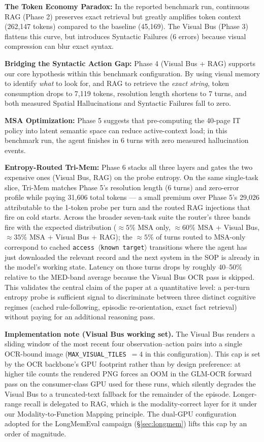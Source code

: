 \documentclass[conference]{IEEEtran}
\begin{document}
\textbf{The Token Economy Paradox:} In the reported benchmark run, continuous RAG (Phase 2) preserves exact retrieval but greatly amplifies token context (262,147 tokens) compared to the baseline (45,169). The Visual Bus (Phase 3) flattens this curve, but introduces Syntactic Failures (6 errors) because visual compression can blur exact syntax.

\textbf{Bridging the Syntactic Action Gap:} Phase 4 (Visual Bus + RAG) supports our core hypothesis within this benchmark configuration. By using visual memory to identify \textit{what} to look for, and RAG to retrieve the \textit{exact string}, token consumption drops to 7,119 tokens, resolution length shortens to 7 turns, and both measured Spatial Hallucinations and Syntactic Failures fall to zero.

\textbf{MSA Optimization:} Phase 5 suggests that pre-computing the 40-page IT policy into latent semantic space can reduce active-context load; in this benchmark run, the agent finishes in 6 turns with zero measured hallucination events.

\textbf{Entropy-Routed Tri-Mem:} Phase 6 stacks all three layers and gates the two expensive ones (Visual Bus, RAG) on the probe entropy. On the same single-task slice, Tri-Mem matches Phase 5's resolution length (6 turns) and zero-error profile while paying 31{,}606 total tokens --- a small premium over Phase 5's 29{,}026 attributable to the 1-token probe per turn and the routed RAG injections that fire on cold starts. Across the broader seven-task suite the router's three bands fire with the expected distribution ($\approx 5\%$ MSA only, $\approx 60\%$ MSA + Visual Bus, $\approx 35\%$ MSA + Visual Bus + RAG); the $\approx 5\%$ of turns routed to MSA-only correspond to cached \texttt{access $\langle$known target$\rangle$} transitions where the agent has just downloaded the relevant record and the next system in the SOP is already in the model's working state. Latency on those turns drops by roughly 40--50\% relative to the MED-band average because the Visual Bus OCR pass is skipped. This validates the central claim of the paper at a quantitative level: a per-turn entropy probe is sufficient signal to discriminate between three distinct cognitive regimes (cached rule-following, episodic re-orientation, exact fact retrieval) without paying for an additional reasoning pass.

\textbf{Implementation note (Visual Bus working set).} The Visual Bus renders a sliding window of the most recent four observation--action pairs into a single OCR-bound image (\texttt{MAX\_VISUAL\_TILES}~$=4$ in this configuration). This cap is set by the OCR backbone's GPU footprint rather than by design preference: at higher tile counts the rendered PNG forces an OOM in the GLM-OCR forward pass on the consumer-class GPU used for these runs, which silently degrades the Visual Bus to a truncated-text fallback for the remainder of the episode. Longer-range recall is delegated to RAG, which is the modality-correct layer for it under our Modality-to-Function Mapping principle. The dual-GPU configuration adopted for the LongMemEval campaign (\S\ref{sec:longmem}) lifts this cap by an order of magnitude.
\end{document}
